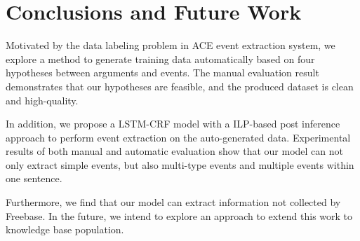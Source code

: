 \documentclass{article}
\begin{document}


\section{Conclusions and Future Work}
Motivated by the data labeling problem in ACE event extraction system, we explore a method to generate training data automatically based on four hypotheses between arguments and events. The manual evaluation result demonstrates that our hypotheses are feasible, and the produced dataset is clean and high-quality.

In addition, we propose a LSTM-CRF model with a ILP-based post inference approach to perform event extraction on the auto-generated data. Experimental results of both manual and automatic evaluation show that our model can not only extract simple events, but also multi-type events and multiple events within one sentence.

Furthermore, we find that our model can extract information not collected by Freebase. In the future, we intend to explore an approach to extend this work to knowledge base population. 




\end{document}

